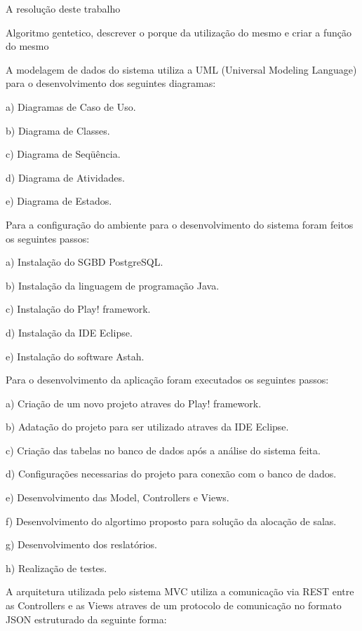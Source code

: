 
A resolução deste trabalho\par

Algoritmo gentetico, descrever o porque da utilização do mesmo e criar a função do mesmo\par
 
A modelagem de dados do sistema utiliza a UML (Universal Modeling Language) para o desenvolvimento dos seguintes diagramas:\par

a) Diagramas de Caso de Uso.\par
b) Diagrama de Classes.\par
c) Diagrama de Seqüência.\par
d) Diagrama de Atividades.\par
e) Diagrama de Estados.\par

Para a configuração do ambiente para o desenvolvimento do sistema foram feitos os seguintes passos:\par

a) Instalação do SGBD PostgreSQL.\par
b) Instalação da linguagem de programação Java.\par
c) Instalação do Play! framework.\par
d) Instalação da IDE Eclipse.\par
e) Instalação do software Astah.\par

Para o desenvolvimento da aplicação foram executados os seguintes passos:\par

a) Criação de um novo projeto atraves do Play! framework.\par
b) Adatação do projeto para ser utilizado atraves da IDE Eclipse.\par
c) Criação das tabelas no banco de dados após a análise do sistema feita.\par
d) Configurações necessarias do projeto para conexão com o banco de dados.\par
e) Desenvolvimento das Model, Controllers e Views.\par
f) Desenvolvimento do algortimo proposto para solução da alocação de salas.\par
g) Desenvolvimento dos reslatórios.\par
h) Realização de testes.\par

A arquitetura utilizada pelo sistema MVC utiliza a comunicação via REST entre as Controllers e as Views atraves de um protocolo de comunicação no formato JSON estruturado da seguinte forma:

